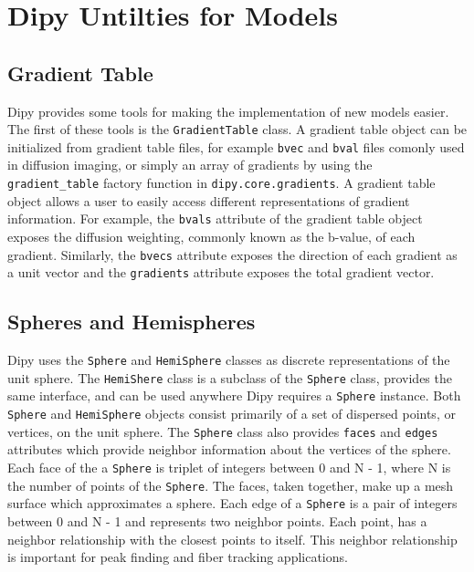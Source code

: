 \section{Dipy Untilties for Models}
\subsection{Gradient Table}
Dipy provides some tools for making the implementation of new models easier. The first of these tools is the \verb|GradientTable| class. A gradient table object can be initialized from gradient table files, for example \verb|bvec| and \verb|bval| files comonly used in diffusion imaging, or simply an array of gradients by using the \verb|gradient_table| factory function in \verb|dipy.core.gradients|. A gradient table object allows a user to easily access different representations of gradient information. For example, the \verb|bvals| attribute of the gradient table object exposes the diffusion weighting, commonly known as the b-value, of each gradient. Similarly, the \verb|bvecs| attribute exposes the direction of each gradient as a unit vector and the \verb|gradients| attribute exposes the total gradient vector.

\subsection{Spheres and Hemispheres}
Dipy uses the \verb|Sphere| and \verb|HemiSphere| classes as discrete representations of the unit sphere. The \verb|HemiShere| class is a subclass of the \verb|Sphere| class, provides the same interface, and can be used anywhere Dipy requires a \verb|Sphere| instance.  Both \verb|Sphere| and \verb|HemiSphere| objects consist primarily of a set of dispersed points, or vertices, on the unit sphere. The \verb|Sphere| class also provides \verb|faces| and \verb|edges| attributes which provide neighbor information about the vertices of the sphere. Each face of the a \verb|Sphere| is triplet of integers between 0 and N - 1, where N is the number of points of the \verb|Sphere|. The faces, taken together, make up a mesh surface which approximates a sphere. Each edge of a \verb|Sphere| is a pair of integers between 0 and N - 1 and represents two neighbor points. Each point, has a neighbor relationship with the closest points to itself. This neighbor relationship is important for peak finding and fiber tracking applications.

